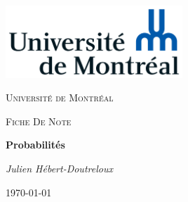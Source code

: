 \documentclass[french, babel]{article}
\begin{document}
\begin{titlepage}
	\centering
	\includegraphics[width=0.5\textwidth]{Universite_de_Montreal_logo}\par\vspace{1cm}
	{\scshape\LARGE Université de Montréal\par}
	\vspace{1cm}
	{\scshape\Large Fiche De Note\par}
	\vspace{1.5cm}
	{\huge\bfseries Probabilités \par}
	\vspace{2cm}
	{\Large\itshape Julien Hébert-Doutreloux\par}
	\vfill
	\vfill
	{\large \today\par}
\end{titlepage}
\tableofcontents
\newpage



\end{document}
